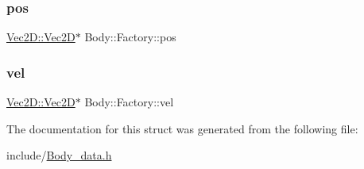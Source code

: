 \mbox{\label{struct_body_1_1_factory_abf9af0a85100a3d9070be4b9b30a72ce}} 
\subsubsection{\texorpdfstring{pos}{pos}}
{\footnotesize\ttfamily \mbox{\hyperlink{struct_vec2_d_1_1_vec2_d}{Vec2\+D\+::\+Vec2D}}$\ast$ Body\+::\+Factory\+::pos}

\mbox{\label{struct_body_1_1_factory_a8e66b2894de92733dc837e30c455b59d}} 
\subsubsection{\texorpdfstring{vel}{vel}}
{\footnotesize\ttfamily \mbox{\hyperlink{struct_vec2_d_1_1_vec2_d}{Vec2\+D\+::\+Vec2D}}$\ast$ Body\+::\+Factory\+::vel}



The documentation for this struct was generated from the following file\+:\begin{DoxyCompactItemize}
\item 
include/\mbox{\hyperlink{_body__data_8h}{Body\+\_\+data.\+h}}\end{DoxyCompactItemize}

